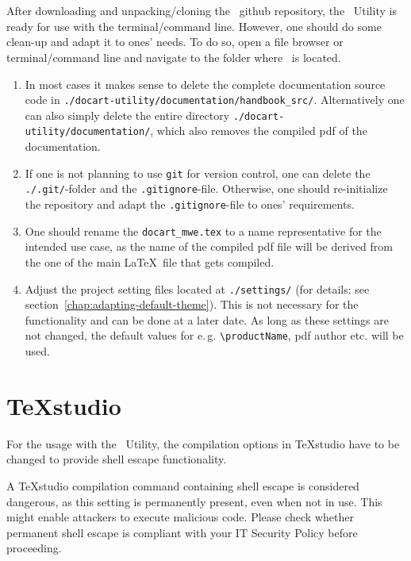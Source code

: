	\section{\productName}
		After downloading and unpacking/cloning the \productName~github repository, the \productName~Utility is ready for use with the terminal/command line. However, one should do some clean-up and adapt it to ones' needs. To do so, open a file browser or terminal/command line and navigate to the folder where \productName~is located.
		\begin{enumerate}[label={\color{docartTurquoise}Step \arabic*:},leftmargin=*]
			\setlength\itemsep{-0.1em}
			\item In most cases it makes sense to delete the complete documentation source code in \mbox{\lstinline{./docart-utility/documentation/handbook_src/}}. Alternatively one can also simply delete the entire directory \mbox{\lstinline{./docart-utility/documentation/}}, which also removes the compiled pdf of the documentation.
			\item If one is not planning to use \lstinline{git} for version control, one can delete the \mbox{\lstinline{./.git/}-folder} and the \mbox{\lstinline{.gitignore}-file}. Otherwise, one should re-initialize the repository and adapt the \mbox{\lstinline{.gitignore}-file} to ones' requirements.
			\item One should rename the \lstinline{docart_mwe.tex} to a name representative for the intended use case, as the name of the compiled pdf file will be derived from the one of the main \LaTeX~file that gets compiled.
			\item Adjust the project setting files located at \mbox{\lstinline{./settings/}} (for details: see \mbox{section \ref{chap:adapting-default-theme}}). This is not necessary for the functionality and can be done at a later date. As long as these settings are not changed, the default values for \mbox{e.\,g.} \lstinline{\productName}, pdf author etc. will be used.
		\end{enumerate} 
	
	\vspace{-2.5cm}
	\section{TeXstudio}
		\label{sec:config:texstudio}
		For the usage with the \productName~Utility, the compilation options in TeXstudio have to be changed to provide shell escape functionality.
		\begin{daWarningBox}
			A TeXstudio compilation command containing shell escape is considered dangerous, as this setting is permanently present, even when not in use. This might enable attackers to execute malicious code.
			Please check whether permanent shell escape is compliant with your IT Security Policy before proceeding.
		\end{daWarningBox} 
		
